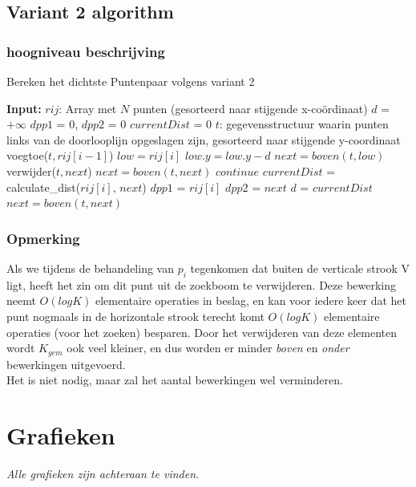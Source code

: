 \documentclass[12pt]{article}
\begin{document}
\newpage
\subsection{Variant 2 algorithm}
\subsubsection{hoogniveau beschrijving}

\begin{algorithm}
\caption{Bereken het dichtste Puntenpaar volgens variant 2}
\begin{algorithmic}
	\STATE \textbf{Input:}  $rij$: Array met $N$ punten (gesorteerd naar stijgende x-co\"ordinaat)
	\STATE $d$ = $+\infty$
	\STATE $dpp1$ = 0, $dpp2$ = 0
	\STATE $currentDist$ = 0
	\STATE $t$: gegevensstructuur waarin punten links van de doorlooplijn opgeslagen zijn, gesorteerd naar stijgende y-coordinaat
    \STATE voegtoe($t, rij[i-1]$)
    \STATE $low = rij[i]$
    \STATE $low.y = low.y - d$
    \STATE $next = boven(t,low)$
        \STATE verwijder($t, next$)
        \STATE $next = boven(t,next)$
        \STATE $continue$
      \ENDIF
      \STATE $currentDist$ = calculate\_dist($rij[i]$, $next$)
  			\STATE $dpp1$ = $rij[i]$
  			\STATE $dpp2$ = $next$
  			\STATE $d$ = $currentDist$
  		\ENDIF
      \STATE $next = boven(t,next)$
    \ENDWHILE
  \ENDFOR
\end{algorithmic}
\end{algorithm}

\subsubsection{Opmerking}
Als we tijdens de behandeling van $p_i$ tegenkomen dat buiten de verticale
strook V ligt, heeft het zin om dit punt uit de zoekboom te verwijderen. Deze bewerking neemt
$O(logK)$ elementaire operaties in beslag, en kan voor iedere keer dat het punt nogmaals in de horizontale strook terecht komt $O(logK)$ elementaire operaties (voor het zoeken) besparen. Door het verwijderen van deze elementen wordt $K_{gem}$ ook veel kleiner, en dus worden er minder \textit{boven} en \textit{onder} bewerkingen uitgevoerd. \\
Het is niet nodig, maar zal het aantal bewerkingen wel verminderen.

\section{Grafieken}
\textit{Alle grafieken zijn achteraan te vinden.}
\end{document}
